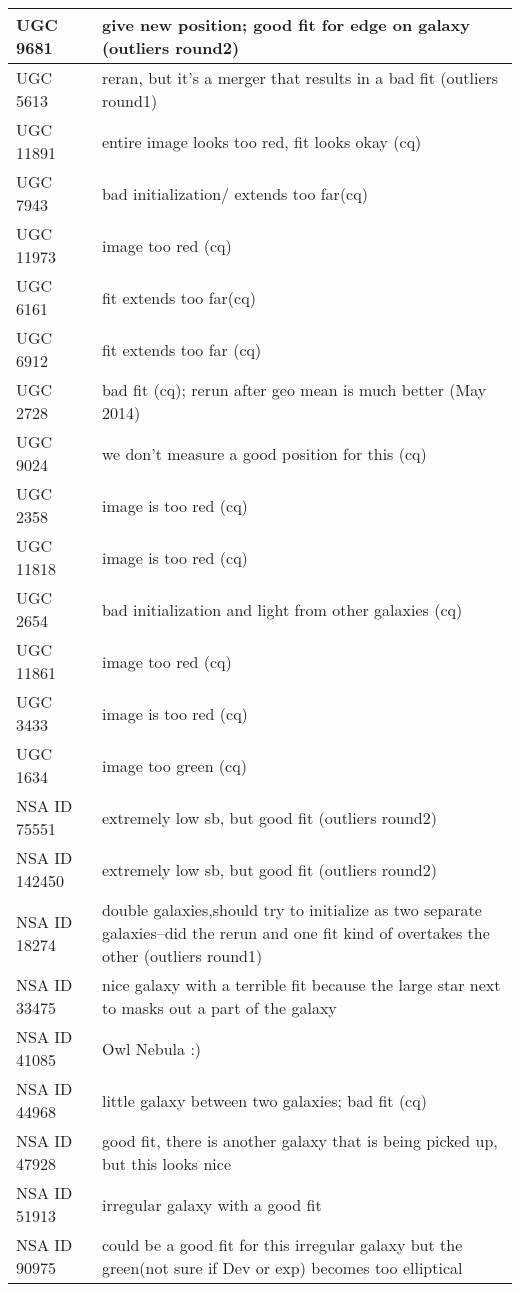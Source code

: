 \documentclass[10pt]{article}
\begin{document}
\begin{landscape}
\begin{longtable}{|l|l|}
UGC 9681 & give new position; good fit for edge on galaxy (outliers round2)\\ \hline
UGC 5613 & reran, but it's a merger that results in a bad fit (outliers round1)\\ \hline
UGC 11891 & entire image looks too red, fit looks okay (cq)\\ \hline
UGC 7943 & bad initialization/ extends too far(cq)\\ \hline
UGC 11973 & image too red (cq)\\ \hline
UGC 6161 & fit extends too far(cq)\\ \hline
UGC 6912 & fit extends too far (cq)\\ \hline
UGC 2728 & bad fit (cq); rerun after geo mean is much better (May 2014)\\ \hline
UGC 9024 & we don't measure a good position for this (cq)\\ \hline
UGC 2358 & image is too red (cq)\\ \hline
UGC 11818 & image is too red (cq)\\ \hline
UGC 2654 & bad initialization and light from other galaxies (cq)\\ \hline
UGC 11861 & image too red (cq)\\ \hline
UGC 3433 & image is too red (cq)\\ \hline
UGC 1634 & image too green (cq)\\ \hline
NSA ID 75551 & extremely low sb, but good fit (outliers round2)\\ \hline
NSA ID 142450 & extremely low sb, but good fit (outliers round2)\\ \hline
NSA ID 18274 & double galaxies,should try to initialize as two separate galaxies--did the rerun and one fit kind of overtakes the other (outliers round1)\\ \hline
NSA ID 33475 & nice galaxy with a terrible fit because the large star next to masks out a part of the galaxy\\ \hline
NSA ID 41085 & Owl Nebula :)\\ \hline
NSA ID 44968 & little galaxy between two galaxies; bad fit (cq)\\ \hline
NSA ID 47928 & good fit, there is another galaxy that is being picked up, but this looks nice\\ \hline
NSA ID 51913 & irregular galaxy with a good fit\\ \hline
NSA ID 90975 & could be a good fit for this irregular galaxy but the green(not sure if Dev or exp) becomes too elliptical\\ \hline

\end{longtable}
\end{landscape}
\end{document}
